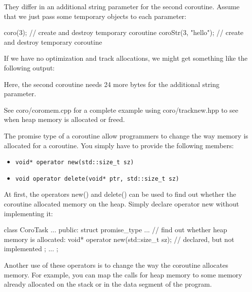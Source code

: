 They differ in an additional string parameter for the second coroutine. Assume that we just pass some temporary objects to each parameter:

\begin{cpp}
coro(3); // create and destroy temporary coroutine
coroStr(3, "hello"); // create and destroy temporary coroutine
\end{cpp}

If we have no optimization and track allocations, we might get something like the following output:


Here, the second coroutine needs 24 more bytes for the additional string parameter.

See coro/coromem.cpp for a complete example using coro/tracknew.hpp to see when heap memory is allocated or freed.


The promise type of a coroutine allow programmers to change the way memory is allocated for a coroutine. You simply have to provide the following members:

\begin{itemize}
\item 
\texttt{void* operator new(std::size\_t sz)}

\item 
\texttt{void operator delete(void* ptr, std::size\_t sz)}
\end{itemize}


At first, the operators new() and delete() can be used to find out whether the coroutine allocated memory on the heap. Simply declare operator new without implementing it:

\begin{cpp}
class CoroTask {
	...
	public:
	struct promise_type {
		...
		// find out whether heap memory is allocated:
		void* operator new(std::size_t sz); // declared, but not implemented
	};
	...
};
\end{cpp}



Another use of these operators is to change the way the coroutine allocates memory. For example, you can map the calls for heap memory to some memory already allocated on the stack or in the data segment of the program.

